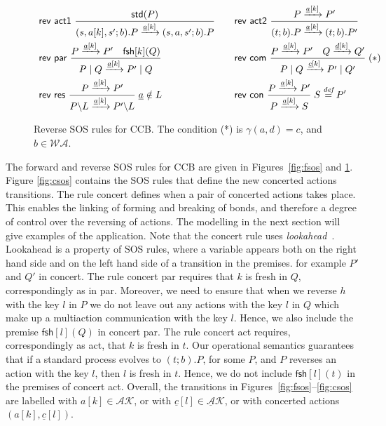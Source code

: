 \documentclass[runningheads]{llncs}
\newcommand{\Rule}[2]{\displaystyle{\frac{#1}{#2}}}
\newcommand{\paral}{\; \vert \;}
\newcommand{\mA}{\mathcal{A}}
\newcommand{\mAK}{\mathcal{AK}}
\newcommand{\umAK}{\underline{\mathcal{A}}\mathcal{K}}
\newcommand{\std}[1]{\mathsf{std}(#1)}
\newcommand{\fresh}[2]{\mathsf{fsh}[#1](#2)}
\newcommand{\bydef}{\stackrel{\emph{def}}{=}}
\newcommand{\rulename}[1]{\textsf{#1}}
\begin{document}
\begin{figure}
\vspace{-2ex}\[
\begin{array}{ll}
\rulename{rev act1}\
\Rule
{\std{P} %
}
{(s,a[k],s';b).P \xrightarrow{\underline{a}[k]}(s,a,s';b).P}
\quad &
\rulename{rev act2}\
\Rule
{P \xrightarrow{\underline{a}[k]} P' %
}
{(t;b).P \xrightarrow{\underline{a}[k]} (t;b).P'}
\\[15pt]
\rulename{rev par}\
\Rule
{P \xrightarrow{\underline{a}[k]} P'\quad \fresh{k}{Q}}
{P \paral Q \xrightarrow{\underline{a}[k]} P' \paral Q}
\quad &
\rulename{rev com}\
\Rule
{P \xrightarrow{\underline{a}[k]} P' \quad Q \xrightarrow{\underline{d}[k]} Q'}
{P \paral Q \xrightarrow{\underline{c}[k]} P' \paral Q'}
\; (*)
%
\\[15pt]
\rulename{rev res}\
\Rule
{P \xrightarrow{\underline{a}[k]} P'}
{P\backslash L \xrightarrow{\underline{a}[k]} P'\backslash L}
\; \underline{a} \notin L
\quad &
\rulename{rev con}\
\Rule
{P \xrightarrow{\underline{a}[k]} P'}
{P \xrightarrow{\underline{a}[k]} S}
\; S \bydef P'
\end{array}
\]
\vspace{-4ex}\caption[Reverse SOS rules for CCB.]{Reverse SOS rules for CCB. The condition (*) is $\gamma(a,d)=c$, and $b \in \mathcal{WA}$. %
} 
\label{fig:reversesos}
\vspace{-2ex}\end{figure}

The forward and reverse SOS rules for CCB are given in Figures~\ref{fig:fsos} and \ref{fig:reversesos}. 
Figure \ref{fig:csos} contains the SOS rules that define the new concerted actions transitions. 
The rule \rulename{concert} defines when a pair of concerted actions 
takes place. This enables the linking of forming and breaking of bonds, and therefore a degree 
of control over 
the reversing of actions. The modelling in the next section will give examples of the application. 
Note that the \rulename{concert} rule uses \emph{lookahead}~\cite{Uli92}. Lookahead is a property 
of SOS rules, where a variable appears both on the right hand side and on the left hand side of 
a transition in the premises. for example $P'$ and $Q'$ in \rulename{concert}. 
The rule \rulename{concert par} requires that $k$ is fresh in $Q$,
correspondingly as in \rulename{par}. Moreover, we need to ensure that when we reverse $h$ with the key $l$
in $P$ we do not leave out any actions with the key $l$ in $Q$ which make up a multiaction 
communication with the key $l$. Hence, we also include the premise $\fresh{l}{Q}$ in \rulename{concert par}.
The rule \rulename{concert act} requires, correspondingly as \rulename{act}, that $k$ is fresh in $t$.
Our operational semantics guarantees that if a standard process evolves to $(t;b).P$, for some $P$, and
$P$ reverses an action with the key $l$, then $l$ is fresh in $t$. Hence, we do not include $\fresh{l}{t}$
in the premises of \rulename{concert act}.
%
%
Overall, the transitions in Figures~\ref{fig:fsos}--\ref{fig:csos} are labelled with $a[k] \in \mAK$, or with 
$\underline{c}[l] \in \umAK$, or with concerted actions $(a[k], \underline{c}[l])$.
\end{document}
